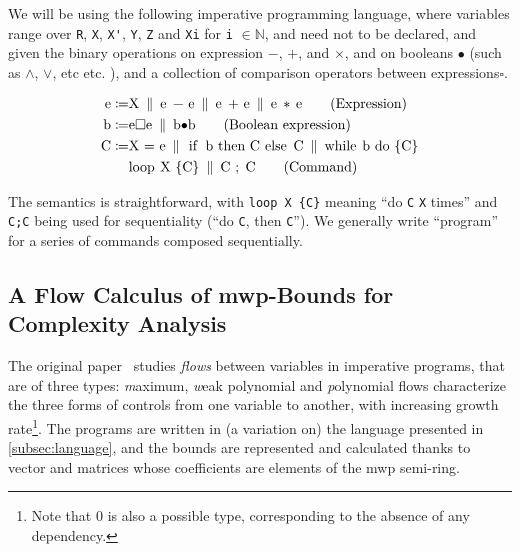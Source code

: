 \documentclass[runningheads]{llncs}
\makeatletter
\newcommand{\BNF}{\enspace \ensuremath{\Vert} \enspace} %
\newcommand{\pr}{\lstinline[mathescape]}
\newcommand*{\etc}{%
	\@ifnextchar{.}%
	{etc}%
	{etc.\@\xspace}%
}
\makeatother
\begin{document}
We will be using the following imperative programming language, where variables range over \pr|R|, \pr|X|, \pr|X'|, \pr|Y|, \pr|Z| and \pr|Xi| for \pr|i| \(\in \mathbb{N}\), and need not to be declared, and given the binary operations on expression \(-\), \(+\), and \(\times\), and on booleans \(\bullet\) (such as \(\wedge\), \(\vee\), \etc), and a collection of comparison operators between expressions\(\square\). %

\begin{align*}
	\text{\pr|e|} \coloneqq & \text{\pr|X|} \BNF \text{\pr|e - e|} \BNF \text{\pr|e + e|} \BNF \text{\pr|e * e|} \tag{Expression} \\
	\text{\pr|b|} \coloneqq & \text{\pr|e $\square$ e|} \BNF \text{\pr|b $\bullet$ b|} \tag{Boolean expression}                   \\
	\text{\pr|C|} \coloneqq & \text{\pr|X = e|} \BNF \text{\pr|if b then C else C|} \BNF \text{\pr|while b do \{C\}|}             \\
	                        & \text{\pr|loop X \{C\}|} \BNF \text{\pr|C ; C|} \tag{Command}
\end{align*}

The semantics is straightforward, with \pr|loop X {C}| meaning \enquote{do \pr|C| \pr|X| times} and \pr|C;C| being used for sequentiality (\enquote{do \pr|C|, then \pr|C|}).
We generally write \enquote{program} for a series of commands composed sequentially.

\subsection{A Flow Calculus of mwp-Bounds for Complexity Analysis}
\label{ssec:a-flow-calculus}

The original paper~\cite{Jones2009} studies \emph{flows} between variables in imperative programs, that are of three types: \emph{m}aximum, \emph{w}eak polynomial and \emph{p}olynomial flows characterize the three forms of controls from one variable to another, with increasing growth rate\footnote{Note that \(0\) is also a possible type, corresponding to the absence of any dependency.}.
The programs are written in (a variation on) the language presented in \autoref{subsec:language}, and %
the bounds are represented and calculated thanks to vector and matrices whose coefficients are elements of the mwp semi-ring.
\end{document}
